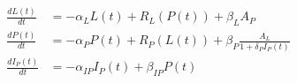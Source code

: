 
\begin{eqnarray*}
  \frac{dL(t)}{dt} &= -\alpha_{L}L(t) + R_{L}(P(t)) + \beta_{L}A_{P} \\
  \frac{dP(t)}{dt} &= -\alpha_{P}P(t) + R_{P}(L(t)) + \beta_{P}\frac{A_{L}}{1+\delta_{P}I_{P}(t)} \\
  \frac{dI_{P}(t)}{dt} &= -\alpha_{IP}I_{P}(t) + \beta_{IP}P(t)
\end{eqnarray*}
